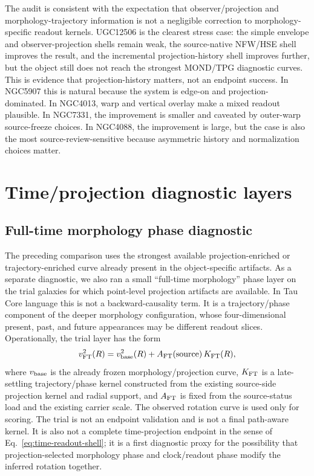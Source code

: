 \documentclass[11pt]{article}
\begin{document}
The audit is consistent with the expectation that observer/projection and
morphology-trajectory information is not a negligible correction to
morphology-specific readout kernels.  UGC12506 is the clearest stress case: the
simple envelope and observer-projection shells remain weak, the source-native
NFW/HSE shell improves the result, and the incremental projection-history shell
improves further, but the object still does not reach the strongest MOND/TPG
diagnostic curves.  This is evidence that projection-history matters, not an
endpoint success.  In NGC5907 this is natural because the system is edge-on and
projection-dominated.  In NGC4013, warp and vertical overlay make a mixed
readout plausible.  In NGC7331, the improvement is smaller and caveated by
outer-warp source-freeze choices.  In NGC4088, the improvement is large, but
the case is also the most source-review-sensitive because asymmetric history
and normalization choices matter.

\section{Time/projection diagnostic layers}
\label{sec:time-diagnostics}

\subsection{Full-time morphology phase diagnostic}

The preceding comparison uses the strongest available projection-enriched or
trajectory-enriched curve already present in the object-specific artifacts.  As
a separate diagnostic, we also ran a small ``full-time morphology'' phase layer
on the trial galaxies for which point-level projection artifacts are available.
In Tau Core language this is not a backward-causality term.  It is a
trajectory/phase component of the deeper morphology configuration, whose
four-dimensional present, past, and future appearances may be different readout
slices.  Operationally, the trial layer has the form
\begin{equation}
  v_{\rm FT}^2(R)
  =
  v_{\rm base}^2(R)
  +
  A_{\rm FT}({\rm source})\,K_{\rm FT}(R),
  \label{eq:full-time-trial}
\end{equation}
where \(v_{\rm base}\) is the already frozen morphology/projection curve,
\(K_{\rm FT}\) is a late-settling trajectory/phase kernel constructed from the
existing source-side projection kernel and radial support, and
\(A_{\rm FT}\) is fixed from the source-status load and the existing carrier
scale.  The observed rotation curve is used only for scoring.  The trial is not
an endpoint validation and is not a final path-aware kernel.  It is also not a
complete time-projection endpoint in the sense of
Eq.~\eqref{eq:time-readout-shell}; it is a first diagnostic proxy for the
possibility that projection-selected morphology phase and clock/readout phase
modify the inferred rotation together.
\end{document}
